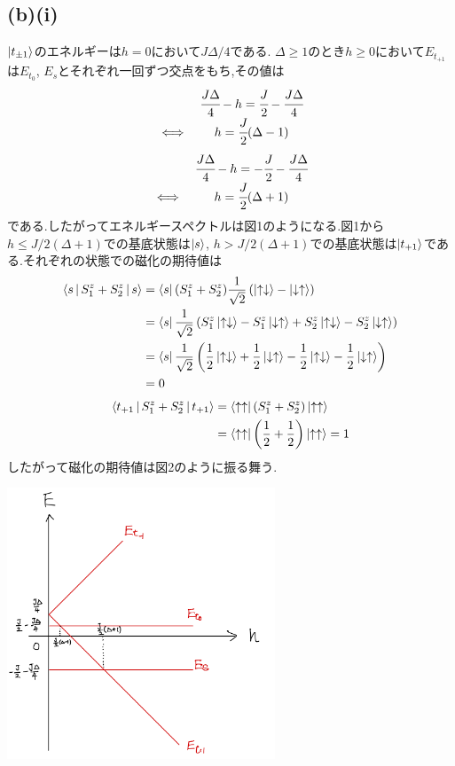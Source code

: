 \documentclass[uplatex,a4j,11pt,dvipdfmx]{jsarticle}
\makeatletter
\def\fgcaption{\def\@captype{figure}\caption}
\newcommand{\up}{\uparrow}
\newcommand{\dn}{\downarrow}
\makeatother
\begin{document}
\subsection*{(b)(i)}
$\Ket{t_{\pm1}}$のエネルギーは$h=0$において$J\Delta/4$である.
$\Delta\geq1$のとき$h\geq0$において$E_{t_{+1}}$は$E_{t_0}$, $E_s$とそれぞれ一回ずつ交点をもち,その値は
\begin{align}
  \begin{array}{cc}
    &\cfrac{J\Delta}{4}-h=\cfrac{J}{2}-\cfrac{J\Delta}{4}\\
    \iff&h=\cfrac{J}{2}(\Delta-1)
  \end{array}
\end{align}
\begin{align}
  \begin{array}{cc}
    &\cfrac{J\Delta}{4}-h=-\cfrac{J}{2}-\cfrac{J\Delta}{4}\\
    \iff&h=\cfrac{J}{2}(\Delta+1)
  \end{array}
\end{align}
である.したがってエネルギースペクトルは図1のようになる.図1から$h\leq J/2(\Delta+1)$での基底状態は$\Ket{s}$,
$h>J/2(\Delta+1)$での基底状態は$\Ket{t_{+1}}$である.それぞれの状態での磁化の期待値は
\begin{align}
  \begin{split}
    \Braket{s|S_1^z+S_2^z|s}&=\Bra{s}(S_1^z+S_2^z)\frac{1}{\sqrt{2}}\left(\Ket{\up\dn}-\Ket{\dn\up}\right)\\
    &=\Bra{s}\frac{1}{\sqrt{2}}\left(S_1^z\Ket{\up\dn}-S_1^z\Ket{\dn\up}+S_2^z\Ket{\up\dn}-S_2^z\Ket{\dn\up}\right)\\
    &=\Bra{s}\frac{1}{\sqrt{2}}\left(\frac{1}{2}\Ket{\up\dn}+\frac{1}{2}\Ket{\dn\up}-\frac{1}{2}\Ket{\up\dn}-\frac{1}{2}\Ket{\dn\up}\right)\\
    &=0
  \end{split}
\end{align}
\begin{align}
  \begin{split}
    \Braket{t_{+1}|S_1^z+S_2^z|t_{+1}}&=\Bra{\up\up}(S_1^z+S_2^z)\Ket{\up\up}\\
    &=\Bra{\up\up}\left(\frac{1}{2}+\frac{1}{2}\right)\Ket{\up\up}=1
  \end{split}
\end{align}
したがって磁化の期待値は図2のように振る舞う.
\begin{center}
  \includegraphics[width=8cm]{espec_dgeq0.png}
  \fgcaption{$\Delta\geq1$の場合のエネルギースペクトル}
\end{center}
\end{document}
